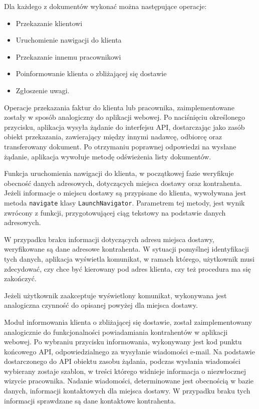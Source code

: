 Dla każdego z dokumentów wykonać można następujące operacje:
\begin{itemize}
	\item Przekazanie klientowi
	\item Uruchomienie nawigacji do klienta
	\item Przekazanie innemu pracownikowi
	\item Poinformowanie klienta o zbliżającej się dostawie
	\item Zgłoszenie uwagi.
\end{itemize}

Operacje przekazania faktur do klienta lub pracownika, zaimplementowane zostały w sposób analogiczny do aplikacji webowej. Po naciśnięciu określonego przycisku, aplikacja wysyła żądanie do interfejsu API, dostarczając jako zasób obiekt przekazania, zawierający między innymi nadawcę, odbiorcę oraz transferowany dokument. Po otrzymaniu poprawnej odpowiedzi na wysłane żądanie, aplikacja wywołuje metodę odświeżenia listy dokumentów.

Funkcja uruchomienia nawigacji do klienta, w początkowej fazie weryfikuje obecność danych adresowych, dotyczących miejsca dostawy oraz kontrahenta. Jeżeli informacje o miejscu dostawy są przypisane do klienta, wywoływana jest metoda \texttt{navigate} klasy \texttt{LaunchNavigator}. Parametrem tej metody, jest wynik zwrócony z funkcji, przygotowującej ciąg tekstowy na podstawie danych adresowych.

W przypadku braku informacji dotyczących adresu miejsca dostawy, weryfikowane są dane adresowe kontrahenta. W sytuacji pomyślnej identyfikacji tych danych, aplikacja wyświetla komunikat, w ramach którego, użytkownik musi zdecydować, czy chce być kierowany pod adres klienta, czy też procedura ma się zakończyć.

Jeżeli użytkownik zaakceptuje wyświetlony komunikat, wykonywana jest analogiczna czynność do opisanej powyżej dla miejsca dostawy.

Moduł informowania klienta o zbliżającej się dostawie, został zaimplementowany analogicznie do funkcjonalności powiadamiania kontrahentów w aplikacji webowej. Po wybraniu przycisku informowania, wykonywany jest kod punktu końcowego API, odpowiedzialnego za wysyłanie wiadomości e-mail. Na podstawie dostarczonego do API obiektu zasobu żądania, podczas wysłania wiadomości wybierany zostaje szablon, w treści którego widnieje informacja o niezwłocznej wizycie pracownika. Nadanie wiadomości, determinowane jest obecnością w bazie danych, informacji kontaktowych dla miejsca dostawy. W przypadku braku tych informacji sprawdzane są dane kontaktowe kontrahenta. 

